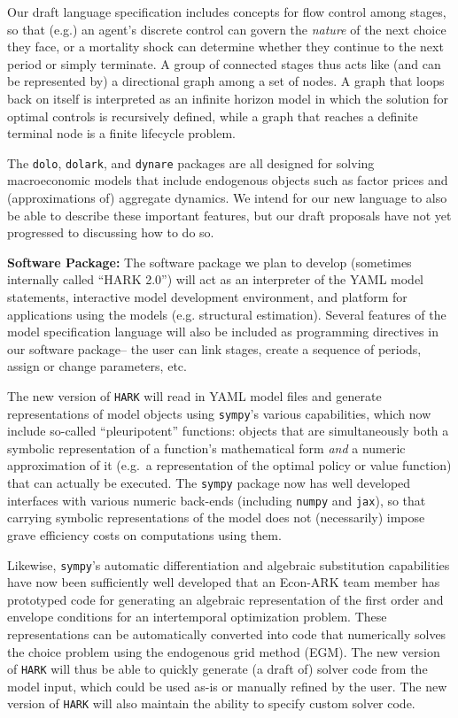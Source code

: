 \documentclass[12pt,pdftex,letterpaper]{article}
\begin{document}
Our draft language specification includes concepts for flow control among stages, so that (e.g.) an agent's discrete control can govern the \textit{nature} of the next choice they face, or a mortality shock can determine whether they continue to the next period or simply terminate. A group of connected stages thus acts like (and can be represented by) a directional graph among a set of nodes. A graph that loops back on itself is interpreted as an infinite horizon model in which the solution for optimal controls is recursively defined, while a graph that reaches a definite terminal node is a finite lifecycle problem. 

The \texttt{dolo}, \texttt{dolark}, and \texttt{dynare} packages are all designed for solving macroeconomic models that include endogenous objects such as factor prices and (approximations of) aggregate dynamics. We intend for our new language to also be able to describe these important features, but our draft proposals have not yet progressed to  discussing how to do so.

\vspace{0.35cm}

\noindent \textbf{Software Package:} The software package we plan to develop (sometimes internally called ``HARK 2.0'') will act as an interpreter of the YAML model statements, interactive model development environment, and platform for applications using the models (e.g. structural estimation). Several features of the model specification language will also be included as programming directives in our software package-- the user can link stages, create a sequence of periods, assign or change parameters, etc.

The new version of \texttt{HARK} will read in YAML model files and generate representations of model objects using \texttt{sympy}'s various capabilities, which now include so-called ``pleuripotent'' functions: objects that are simultaneously both a symbolic representation of a function's mathematical form \textit{and} a numeric approximation of it (e.g.\ a representation of the optimal policy or value function) that can actually be executed. The \texttt{sympy} package now has well developed interfaces with various numeric back-ends (including \texttt{numpy} and \texttt{jax}), so that carrying symbolic representations of the model does not (necessarily) impose grave efficiency costs on computations using them.

Likewise, \texttt{sympy}'s automatic differentiation and algebraic substitution capabilities have now been sufficiently well developed that an Econ-ARK team member has prototyped code for generating an algebraic representation of the first order and envelope conditions for an intertemporal optimization problem. These representations can be automatically converted into code that numerically solves the choice problem using the endogenous grid method (EGM). The new version of \texttt{HARK} will thus be able to quickly generate (a draft of) solver code from the model input, which could be used as-is or manually refined by the user. The new version of \texttt{HARK} will also maintain the ability to specify custom solver code.
\end{document}
